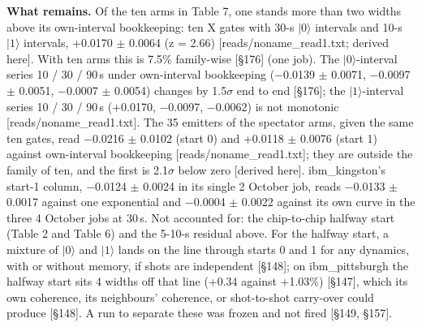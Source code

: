 \documentclass[11pt]{article}
\begin{document}
\textbf{What remains.} Of the ten arms in Table 7, one stands more than two widths above its own-interval bookkeeping: ten X gates with 30-\textmu s \(|0\rangle\) intervals and 10-\textmu s \(|1\rangle\) intervals, +0.0170 \(\pm\) 0.0064 (z = 2.66) {[}reads/noname\_read1.txt; derived here{]}. With ten arms this is 7.5\% family-wise {[}\S{}176{]} (one job). The \(|0\rangle\)-interval series 10 / 30 / 90\,\textmu s under own-interval bookkeeping (\(-\)0.0139 \(\pm\) 0.0071, \(-\)0.0097 \(\pm\) 0.0051, \(-\)0.0007 \(\pm\) 0.0054) changes by 1.5\(\sigma\) end to end {[}\S{}176{]}; the \(|1\rangle\)-interval series 10 / 30 / 90\,\textmu s (+0.0170, \(-\)0.0097, \(-\)0.0062) is not monotonic {[}reads/noname\_read1.txt{]}. The 35 emitters of the spectator arms, given the same ten gates, read \(-\)0.0216 \(\pm\) 0.0102 (start 0) and +0.0118 \(\pm\) 0.0076 (start 1) against own-interval bookkeeping {[}reads/noname\_read1.txt{]}; they are outside the family of ten, and the first is 2.1\(\sigma\) below zero {[}derived here{]}. ibm\_kingston's start-1 column, \(-\)0.0124 \(\pm\) 0.0024 in its single 2 October job, reads \(-\)0.0133 \(\pm\) 0.0017 against one exponential and \(-\)0.0004 \(\pm\) 0.0022 against its own curve in the three 4 October jobs at 30\,\textmu s. Not accounted for: the chip-to-chip halfway start (Table 2 and Table 6) and the 5-10-\textmu s residual above. For the halfway start, a mixture of \(|0\rangle\) and \(|1\rangle\) lands on the line through starts 0 and 1 for any dynamics, with or without memory, if shots are independent {[}\S{}148{]}; on ibm\_pittsburgh the halfway start sits 4 widths off that line (+0.34 against +1.03\%) {[}\S{}147{]}, which its own coherence, its neighbours' coherence, or shot-to-shot carry-over could produce {[}\S{}148{]}. A run to separate these was frozen and not fired {[}\S{}149, \S{}157{]}.
\end{document}
